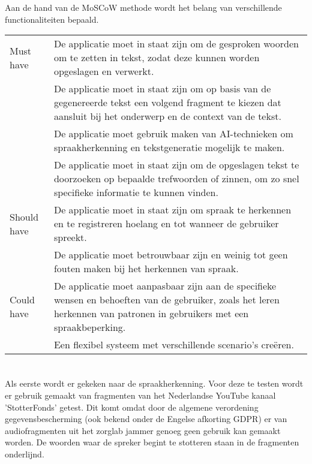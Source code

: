 Aan de hand van de MoSCoW methode wordt het belang van verschillende functionaliteiten bepaald.
\begin{center}
    \begin{tabular}{ |p{2.5cm}|p{12cm}| }
        \hline
       Must have & De applicatie moet in staat zijn om de gesproken woorden om te zetten in tekst, zodat deze kunnen worden opgeslagen en verwerkt. \\
       \cline{2-2}
        & De applicatie moet in staat zijn om op basis van de gegenereerde tekst een volgend fragment te kiezen dat aansluit bij het onderwerp en de context van de tekst. \\
        \cline{2-2}
        & De applicatie moet gebruik maken van AI-technieken om spraakherkenning en tekstgeneratie mogelijk te maken. \\
        \cline{2-2}
        & De applicatie moet in staat zijn om de opgeslagen tekst te doorzoeken op bepaalde trefwoorden of zinnen, om zo snel specifieke informatie te kunnen vinden. \\
        \hline
        Should have & De applicatie moet in staat zijn om spraak te herkennen en te registreren hoelang en tot wanneer de gebruiker spreekt. \\
        \cline{2-2}
        & De applicatie moet betrouwbaar zijn en weinig tot geen fouten maken bij het herkennen van spraak. \\
        \hline
        Could have & De applicatie moet aanpasbaar zijn aan de specifieke wensen en behoeften van de gebruiker, zoals het leren herkennen van patronen in gebruikers met een spraakbeperking. \\
        \cline{2-2}
        & Een flexibel systeem met verschillende scenario’s creëren. \\
        \hline
    \end{tabular}
\end{center}

\section{} \label{sect:Speechrecognition}%
Als eerste wordt er gekeken naar de spraakherkenning. Voor deze te testen wordt er gebruik gemaakt van fragmenten van het Nederlandse YouTube kanaal 'StotterFonds' getest. Dit komt omdat door de algemene verordening gegevensbescherming (ook bekend onder de Engelse afkorting GDPR) er van audiofragmenten uit het zorglab jammer genoeg geen gebruik kan gemaakt worden. De woorden waar de spreker begint te stotteren staan in de fragmenten onderlijnd.

